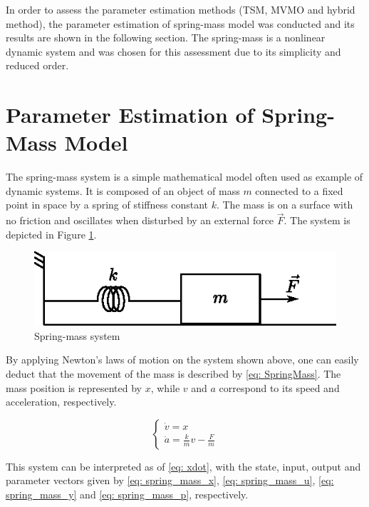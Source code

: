 In order to assess the parameter estimation methods (TSM, MVMO and hybrid method), the parameter estimation of spring-mass model was conducted and its results are shown in the following section. The spring-mass is a nonlinear dynamic system and was chosen for this assessment due to its simplicity and reduced order.

\section{Parameter Estimation of Spring-Mass Model}

The spring-mass system is a simple mathematical model often used as example of dynamic systems. It is composed of an object of mass $m$ connected to a fixed point in space by a spring of stiffness constant $k$. The mass is on a surface with no friction and oscillates when disturbed by an external force $\vec{F}$. The system is depicted in Figure \ref{fig: spring_mass}.

\begin{figure}[h]
	\caption{Spring-mass system}
	\begin{center}
		\includegraphics[scale=1]{Images/spring_mass.eps}
	\end{center}
	\label{fig: spring_mass}
\end{figure}

By applying Newton's laws of motion on the system shown above, one can easily deduct that the movement of the mass is described by \eqref{eq: SpringMass}. The mass position is represented by $x$, while $v$ and $a$ correspond to its speed and acceleration, respectively.

\begin{equation}
	\begin{cases}
		\dot{v} = x \\
		\dot{a} = \frac{k}{m}v - \frac{F}{m}
	\end{cases}
	\label{eq: SpringMass}
\end{equation}

This system can be interpreted as of \eqref{eq: xdot}, with the state, input, output and parameter vectors given by \eqref{eq: spring_mass_x}, \eqref{eq: spring_mass_u}, \eqref{eq: spring_mass_y} and \eqref{eq: spring_mass_p}, respectively.

